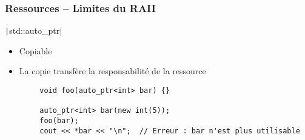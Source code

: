 \documentclass[C++.tex]{subfiles}
\begin{document}
\begin{frame}[fragile]
	\frametitle{Ressources -- Limites du RAII}
	\begin{alertblock}{\texttt|std::auto_ptr|}
		\begin{itemize}
			\item Copiable
			\item La copie transfère la responsabilité de la ressource
		\end{itemize}
	\end{alertblock}

	\begin{verbatim}
		void foo(auto_ptr<int> bar) {}

		auto_ptr<int> bar(new int(5));
		foo(bar);
		cout << *bar << "\n";  // Erreur : bar n'est plus utilisable
	\end{verbatim}
\end{frame}
\end{document}
